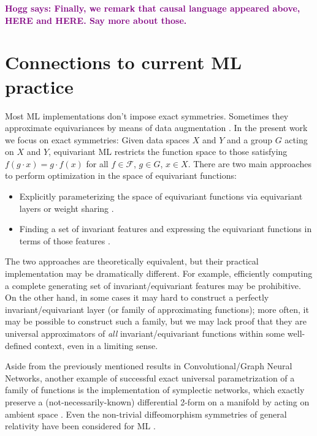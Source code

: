 \documentclass[preprint]{article} %
\renewcommand{\mathcal}[1]{\mathscr{#1}} %
\newcommand{\hogg}[1]{\textcolor{purple}{\textbf{Hogg says: #1}}}
\begin{document}
\hogg{Finally, we remark that causal language appeared above, HERE and HERE. Say more about those.}

\section{Connections to current ML practice}\label{sec:practice}
Most ML implementations don't impose exact symmetries. Sometimes they approximate equivariances by means of data augmentation \citep{chen2020group, huang2022quantifying}.
In the present work we focus on exact symmetries: Given data spaces $X$ and $Y$ and a group $G$ acting on $X$ and $Y$, equivariant ML restricts the function space to those satisfying  $f(g\cdot x) = g \cdot f(x)$ for all $f\in \mathcal F$, $g\in G$, $x\in X$.
There are two main approaches to perform optimization in the space of equivariant functions:
\begin{itemize}
    \item Explicitly parameterizing the space of equivariant functions via equivariant layers or weight sharing \citep{cohen2016group, kondor2018convolution, thomas2018tensor, geiger2022e3nn, finzi2020generalizing, finzi2021practical}.
    \item Finding a set of invariant features and expressing the equivariant functions in terms of those features \citep{villar2021scalars,blum2022equivariant}.
\end{itemize}
The two approaches are theoretically equivalent, but their practical implementation may be dramatically different. For example, efficiently computing a complete generating set of invariant/equivariant features may be prohibitive. On the other hand, in some cases it may hard to construct a perfectly invariant/equivariant layer (or family of approximating functions); more often, it may be possible to construct such a family, but we may lack proof that they are universal approximators of \textit{all} invariant/equivariant functions within some well-defined context, even in a limiting sense.

Aside from the previously mentioned results in Convolutional/Graph Neural Networks, another example of successful exact universal parametrization of a family of functions is the implementation of symplectic networks, which exactly preserve a (not-necessarily-known) differential 2-form on a manifold by acting on ambient space \citep{sympnets,henonnets}. Even the non-trivial diffeomorphism symmetries of general relativity have been considered for ML \citep{weiler}.
 
\end{document}
